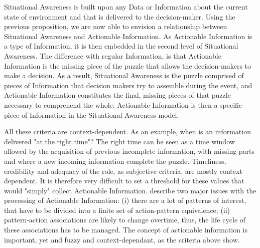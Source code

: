 Situational Awareness is built upon any Data or Information about the current state of environment and that is delivered to the decision-maker.
Using the previous proposition, we are now able to envision a relationship between Situational Awareness and Actionable Information.
As Actionable Information is a type of Information, it is then embedded in the second level of Situational Awareness.
The difference with regular Information, is that Actionable Information is the missing piece of the puzzle that allows the decision-makers to make a decision.
As a result, Situational Awareness is the puzzle comprised of pieces of Information that
decision makers try to assemble during the event, and Actionable Information constitutes
the final, missing pieces of that puzzle necessary to comprehend the whole.
Actionable Information is then a specific piece of Information in the Situational Awareness model.

All these criteria are context-dependent.
As an example, when is an information delivered "at the right time"?
The right time can be seen as a time window allowed by the acquisition of previous incomplete
information, with missing parts and where a new incoming information complete the puzzle.
Timeliness, credibility and adequacy of the role, as subjective criteria, are mostly context dependent.
It is therefore very difficult to set a threshold for these values that would "simply" collect Actionable Information.
\textcite{silberschatzWhatMakesPatterns1996} describe two major issues with the processing of Actionable Information:
(i) there are a lot of patterns of interest, that have to be divided into a finite set of action-pattern equivalence;
(ii) pattern-action associations are likely to change overtime, thus, the life cycle of these associations has to be managed.
The concept of actionable information is important, yet and fuzzy and context-dependant, as the criteria above show.

